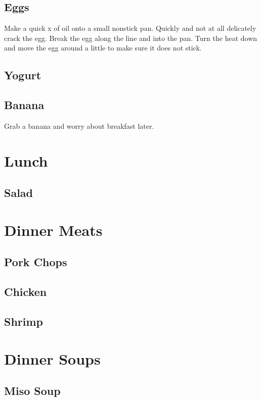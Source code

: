 \documentclass{article}
\begin{document}
\subsection*{Eggs}
Make a quick x of oil onto a small nonstick pan. Quickly and not at all delicately crack the egg. Break the egg along the line and into the pan. Turn the heat down and move the egg around a little to make sure it does not stick.   

\subsection*{Yogurt}

\subsection*{Banana}
Grab a banana and worry about breakfast later.

\section*{Lunch}

\subsection*{Salad}

\section*{Dinner Meats}

\subsection*{Pork Chops}

\subsection*{Chicken}

\subsection*{Shrimp}

\section{Dinner Soups} 

\subsection*{Miso Soup}
\end{document}
